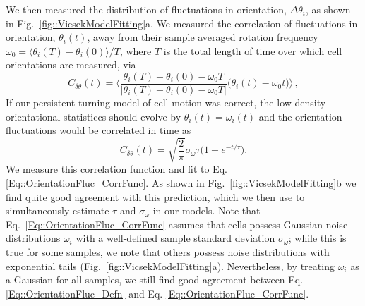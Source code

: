 \documentclass[reprint,unsortedaddress,amsmath,amssymb,aps,pre]{revtex4-2}
\begin{document}
We then measured the distribution of fluctuations in orientation, $\Delta \theta_i$, as shown in Fig.~\ref{fig::VicsekModelFitting}a. We measured the correlation of fluctuations in orientation, $\theta_i(t)$, away from their sample averaged rotation frequency $\omega_0=\langle{\theta_i(T)-\theta_i(0)}\rangle/T$, where $T$ is the total length of time over which cell orientations are measured, via \cite{sugi2019c}
    \begin{equation}
        \label{Eq::OrientationFluc_Defn}
        C_{\delta\theta}(t)=\Big\langle\frac{\theta_i(T)-\theta_i(0)-\omega_0T}{|\theta_i(T)-\theta_i(0)-\omega_0T|}
        \Big(\theta_i(t)-\omega_0t\Big)\Big\rangle\,,
    \end{equation}
If our persistent-turning model of cell motion was correct, the low-density orientational statisticcs should evolve by $\Dot{\theta}_i(t)=\omega_i(t)$ and the orientation fluctuations would be correlated in time as
    \begin{equation}
        \label{Eq::OrientationFluc_CorrFunc}
        C_{\delta\theta}(t)=\sqrt{\frac{2}{\pi}}\sigma_{\omega}\tau\Big(1-e^{-t/\tau}\Big).
    \end{equation}
We measure this correlation function and fit to Eq. \ref{Eq::OrientationFluc_CorrFunc}. As shown in Fig.~\ref{fig::VicsekModelFitting}b we find quite good agreement with this prediction, which we then use to simultaneously estimate $\tau$ and $\sigma_{\omega}$ in our models. Note that Eq.~\ref{Eq::OrientationFluc_CorrFunc} assumes that cells possess Gaussian noise distributions $\omega_{i}$ with a well-defined sample standard deviation $\sigma_{\omega}$; while this is true for some samples, we note that others possess noise distributions with exponential tails (Fig.~\ref{fig::VicsekModelFitting}a). Nevertheless, by treating $\omega_i$ as a Gaussian for all samples, we still find good agreement between Eq. \ref{Eq::OrientationFluc_Defn} and Eq.  \ref{Eq::OrientationFluc_CorrFunc}.
\end{document}
